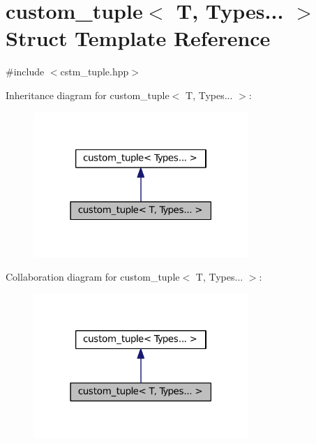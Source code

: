 \hypertarget{structcustom__tuple_3_01T_00_01Types_8_8_8_01_4}{}\section{custom\+\_\+tuple$<$ T, Types... $>$ Struct Template Reference}
\label{structcustom__tuple_3_01T_00_01Types_8_8_8_01_4}


{\ttfamily \#include $<$cstm\+\_\+tuple.\+hpp$>$}



Inheritance diagram for custom\+\_\+tuple$<$ T, Types... $>$\+:
\nopagebreak
\begin{figure}[H]
\begin{center}
\leavevmode
\includegraphics[width=231pt]{structcustom__tuple_3_01T_00_01Types_8_8_8_01_4__inherit__graph}
\end{center}
\end{figure}


Collaboration diagram for custom\+\_\+tuple$<$ T, Types... $>$\+:
\nopagebreak
\begin{figure}[H]
\begin{center}
\leavevmode
\includegraphics[width=231pt]{structcustom__tuple_3_01T_00_01Types_8_8_8_01_4__coll__graph}
\end{center}
\end{figure}
